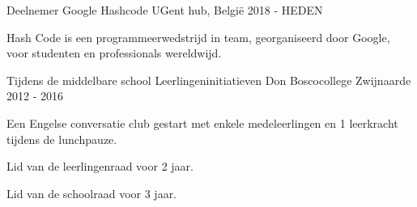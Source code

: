 

\begin{cventries}

  \cventry
    {Deelnemer} %
    {Google Hashcode} %
    {UGent hub, België} %
    {2018 - HEDEN} %
    {
      \begin{cvitems} %
      Hash Code is een programmeerwedstrijd in team, georganiseerd door Google, voor studenten en professionals wereldwijd.
      \end{cvitems}
    }

  \cventry
    {Tijdens de middelbare school} %
    {Leerlingeninitiatieven} %
    {Don Boscocollege Zwijnaarde} %
    {2012 - 2016} %
    {
      \begin{cvitems} %
         \item Een Engelse conversatie club gestart met enkele medeleerlingen en 1 leerkracht tijdens de lunchpauze.
         \item Lid van de leerlingenraad voor 2 jaar.
         \item Lid van de schoolraad voor 3 jaar.
      \end{cvitems}
    }

\end{cventries}
